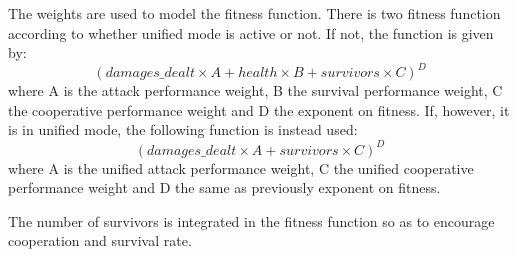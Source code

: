 The weights are used to model the fitness function. There is two fitness function according to whether unified mode is active or not.
If not, the function is given by:
\[(damages\_dealt × A + health × B + survivors × C)^D\]
where A is the attack performance weight, B the survival performance weight, C the
cooperative performance weight and D the exponent on fitness.
If, however, it is in unified mode, the following function is instead used:
\[(damages\_dealt × A + survivors × C)^D\]
where A is the unified attack performance weight, C the unified cooperative performance weight
and D the same as previously exponent on fitness.

The number of survivors is integrated in the fitness function so as to encourage cooperation and survival rate.

